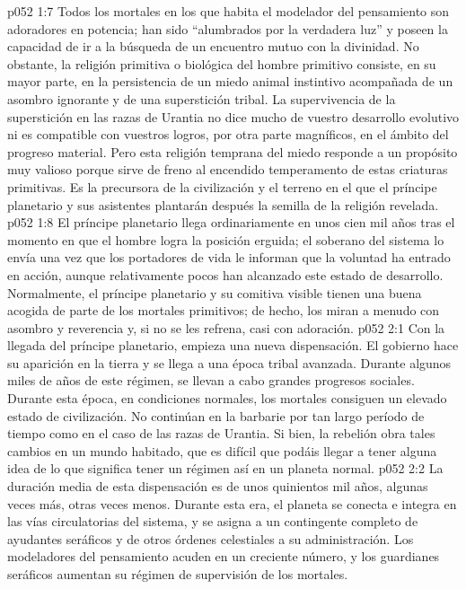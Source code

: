 \vs p052 1:7 Todos los mortales en los que habita el modelador del pensamiento son adoradores en potencia; han sido “alumbrados por la verdadera luz” y poseen la capacidad de ir a la búsqueda de un encuentro mutuo con la divinidad. No obstante, la religión primitiva o biológica del hombre primitivo consiste, en su mayor parte, en la persistencia de un miedo animal instintivo acompañada de un asombro ignorante y de una superstición tribal. La supervivencia de la superstición en las razas de Urantia no dice mucho de vuestro desarrollo evolutivo ni es compatible con vuestros logros, por otra parte magníficos, en el ámbito del progreso material. Pero esta religión temprana del miedo responde a un propósito muy valioso porque sirve de freno al encendido temperamento de estas criaturas primitivas. Es la precursora de la civilización y el terreno en el que el príncipe planetario y sus asistentes plantarán después la semilla de la religión revelada.
\vs p052 1:8 \pc El príncipe planetario llega ordinariamente en unos cien mil años tras el momento en que el hombre logra la posición erguida; el soberano del sistema lo envía una vez que los portadores de vida le informan que la voluntad ha entrado en acción, aunque relativamente pocos han alcanzado este estado de desarrollo. Normalmente, el príncipe planetario y su comitiva visible tienen una buena acogida de parte de los mortales primitivos; de hecho, los miran a menudo con asombro y reverencia y, si no se les refrena, casi con adoración.
\vs p052 2:1 Con la llegada del príncipe planetario, empieza una nueva dispensación. El gobierno hace su aparición en la tierra y se llega a una época tribal avanzada. Durante algunos miles de años de este régimen, se llevan a cabo grandes progresos sociales. Durante esta época, en condiciones normales, los mortales consiguen un elevado estado de civilización. No continúan en la barbarie por tan largo período de tiempo como en el caso de las razas de Urantia. Si bien, la rebelión obra tales cambios en un mundo habitado, que es difícil que podáis llegar a tener alguna idea de lo que significa tener un régimen así en un planeta normal.
\vs p052 2:2 La duración media de esta dispensación es de unos quinientos mil años, algunas veces más, otras veces menos. Durante esta era, el planeta se conecta e integra en las vías circulatorias del sistema, y se asigna a un contingente completo de ayudantes seráficos y de otros órdenes celestiales a su administración. Los modeladores del pensamiento acuden en un creciente número, y los guardianes seráficos aumentan su régimen de supervisión de los mortales.
